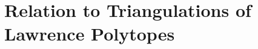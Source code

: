 \documentclass[12pt]{amsart}
\numberwithin{equation}{section}
\theoremstyle{definition}
\newtheorem{corollary}[theorem]{Corollary}
\newtheorem{example}[theorem]{Example}
\newcommand{\Bcal}{{\mathcal B}}
\newcommand{\paco}[1]{\todo[color=orange!30]{\footnotesize \rm #1 \\ \hfill --- P.}}
\begin{document}


%




\section{Relation to Triangulations of Lawrence Polytopes}
\label{sec:lawrence}
\end{document}
